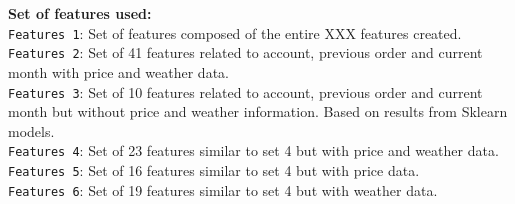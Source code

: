 \textbf{Set of features used:}\\
\texttt{Features 1}: Set of features composed of the entire XXX features created. \\
\texttt{Features 2}: Set of 41 features related to account, previous order and current month with price and weather data. \\
\texttt{Features 3}: Set of 10 features related to account, previous order and current month but without price and weather information. Based on results from Sklearn models.\\
\texttt{Features 4}: Set of 23 features similar to set 4 but with price and weather data. \\
\texttt{Features 5}: Set of 16 features similar to set 4 but with price data. \\
\texttt{Features 6}: Set of 19 features similar to set 4 but with weather data. \\

